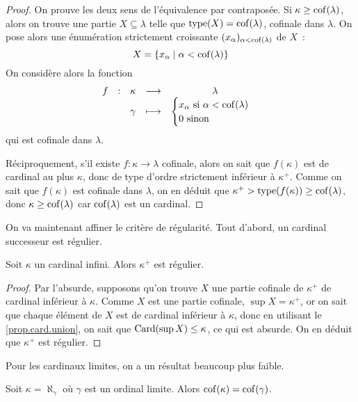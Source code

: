 \begin{proof}
  On prouve les deux sens de l'équivalence par contraposée.
  Si $\kappa \geq \operatorname{cof}(\lambda)$, alors on trouve une partie $X\subseteq\lambda$
  telle que $\operatorname{type}(X)=\operatorname{cof}(\lambda)$, cofinale dans $\lambda$. On pose alors
  une énumération strictement croissante $(x_\alpha)_{\alpha < \operatorname{cof}(\lambda)}$ de
  $X$~:
  \[X = \{x_\alpha\mid \alpha < \operatorname{cof}(\lambda)\}\]
  On considère alors la fonction
  \[\begin{array}{ccccc}
  f & : & \kappa & \longrightarrow & \lambda\\
  & & \gamma & \longmapsto &
  \begin{cases}
  x_\alpha \text{ si } \alpha < \operatorname{cof}(\lambda)\\
  0 \text{ sinon}
  \end{cases}
  \end{array}\]
  qui est cofinale dans $\lambda$.

  Réciproquement, s'il existe $f : \kappa \to \lambda$ cofinale, alors on sait
  que $f(\kappa)$ est de cardinal au plus $\kappa$, donc de type d'ordre
  strictement inférieur à $\kappa^+$. Comme on sait que $f(\kappa)$ est
  cofinale dans $\lambda$, on en déduit que
  $\kappa^+ > \operatorname{type}(f(\kappa)) \geq \operatorname{cof}(\lambda)$, donc
  $\kappa \geq \operatorname{cof}(\lambda)$ car $\operatorname{cof}(\lambda)$ est un cardinal.
\end{proof}

On va maintenant affiner le critère de régularité. Tout d'abord, un cardinal
successeur est régulier.

\begin{theorem}
  Soit $\kappa$ un cardinal infini. Alors $\kappa^+$ est régulier.
\end{theorem}

\begin{proof}
  Par l'absurde, supposons qu'on trouve $X$ une partie cofinale de $\kappa^+$
  de cardinal inférieur à $\kappa$. Comme $X$ est une partie cofinale,
  $\sup X = \kappa^+$, or on sait que chaque élément de $X$ est de cardinal
  inférieur à $\kappa$, donc en utilisant le \cref{prop.card.union}, on sait
  que $\operatorname{Card}(\sup X) \leq \kappa$, ce qui est absurde. On en déduit que
  $\kappa^+$ est régulier.
\end{proof}

Pour les cardinaux limites, on a un résultat beaucoup plus faible.

\begin{proposition}
  Soit $\kappa = \aleph_\gamma$ où $\gamma$ est un ordinal limite. Alors
  $\operatorname{cof}(\kappa) = \operatorname{cof}(\gamma)$.
\end{proposition}

